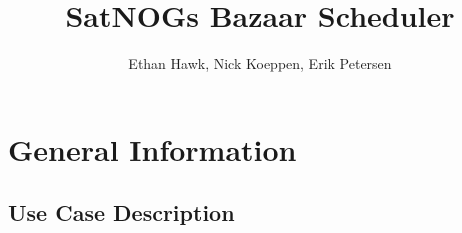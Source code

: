 \documentclass{article}
\author{Ethan Hawk, Nick Koeppen, Erik Petersen}
\title{SatNOGs Bazaar Scheduler}
\begin{document}
\maketitle
\tableofcontents
\section{General Information}

\subsection{Use Case Description}
\end{document}
